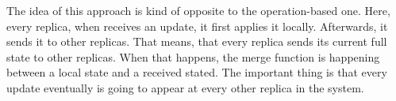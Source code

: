 The idea of this approach is kind of opposite to the operation-based one. Here, every replica, when receives an update, it first applies it locally. Afterwards, it sends it to other replicas. That means, that every replica sends its current full state to other replicas. When that happens, the merge function is happening between a local state and a received stated. The important thing is that every update eventually is going to appear at every other replica in the system. 